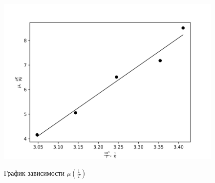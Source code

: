\documentclass[14pt, a4paper]{report}
\begin{document}
\begin{figure}[!ht]
\centering
\includegraphics[scale=0.7]{terma_1_3.png}
\label{image2}
\caption{График зависимости $\mu(\frac{1}{T})$}
\end{figure}
\end{document}
